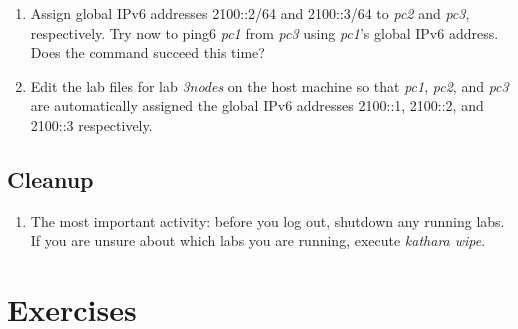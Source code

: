 \documentclass[12pt]{book}
\begin{document}
\begin{enumerate}[resume*]
\item Assign global IPv6 addresses 2100::2/64 and 2100::3/64 to \emph{pc2} and \emph{pc3}, respectively. Try now to ping6 \emph{pc1} from \emph{pc3} using \emph{pc1}'s global IPv6 address. Does the command succeed this time?

  \item Edit the lab files for lab \emph{3nodes} on the host machine so that \emph{pc1}, \emph{pc2}, and \emph{pc3} are automatically assigned the global IPv6 addresses 2100::1, 2100::2, and 2100::3 respectively.
\end{enumerate}

\subsection{Cleanup}

\begin{enumerate}[resume*]
\item The most important activity: before you log out, shutdown any running labs. If you are unsure about which labs you are running, execute \emph{kathara wipe}.
\end{enumerate}


\section{Exercises}
\end{document}
